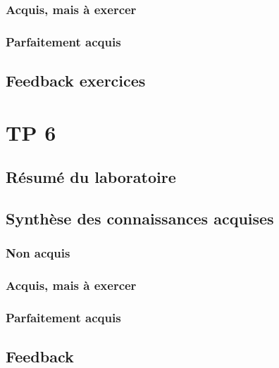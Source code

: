 \documentclass{ReportTemplate}
\begin{document}
\subsection{Acquis, mais à exercer}

\subsection{Parfaitement acquis}

\section{Feedback exercices}


\chapter{TP 6}
\section{Résumé du laboratoire}

\section{Synthèse des connaissances acquises}
\subsection{Non acquis}

\subsection{Acquis, mais à exercer}

\subsection{Parfaitement acquis}

\section{Feedback}
\end{document}
